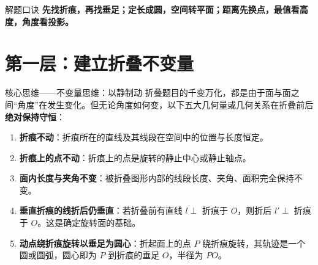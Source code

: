 \documentclass[11pt,a4paper]{ctexart}
\begin{document}
\begin{keybox}{解题口诀}
  \textbf{先找折痕，再找垂足；定长成圆，空间转平面；距离先换点，最值看高度，角度看投影。}
\end{keybox}

\newpage

\section{第一层：建立折叠不变量}

\begin{keybox}{核心思维——不变量思维：以静制动}
折叠题目的千变万化，都是由于面与面之间“角度”在发生变化。但无论角度如何变，以下五大几何量或几何关系在折叠前后\textbf{绝对保持守恒}：
\begin{enumerate}[label=\arabic*., leftmargin=2em, itemsep=0.1em]
  \item \textbf{折痕不动}：折痕所在的直线及其线段在空间中的位置与长度恒定。
  \item \textbf{折痕上的点不动}：折痕上的点是旋转的静止中心或静止轴点。
  \item \textbf{面内长度与夹角不变}：被折叠图形内部的线段长度、夹角、面积完全保持不变。
  \item \textbf{垂直折痕的线折后仍垂直}：若折叠前有直线 $l \perp$ 折痕于 $O$，则折后 $l' \perp$ 折痕于 $O$。这是确定旋转面的基础。
  \item \textbf{动点绕折痕旋转以垂足为圆心}：折起面上的点 $P$ 绕折痕旋转，其轨迹是一个圆或圆弧，圆心即为 $P$ 到折痕的垂足 $O$，半径为 $PO$。
\end{enumerate}
\end{keybox}
\end{document}
